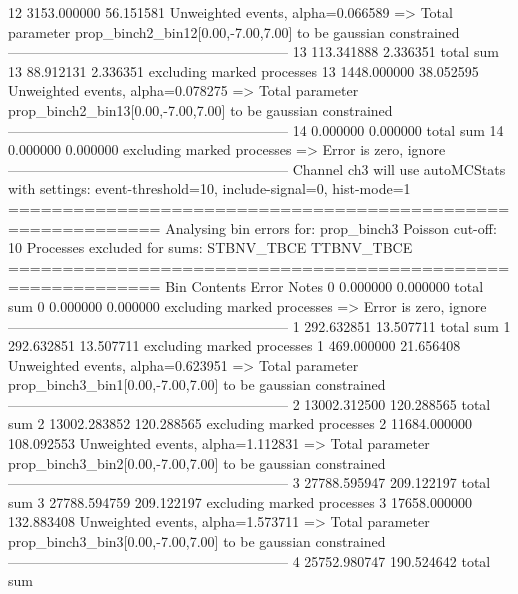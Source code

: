 12         3153.000000     56.151581       Unweighted events, alpha=0.066589
  => Total parameter prop_binch2_bin12[0.00,-7.00,7.00] to be gaussian constrained
------------------------------------------------------------
13         113.341888      2.336351        total sum                     
13         88.912131       2.336351        excluding marked processes    
13         1448.000000     38.052595       Unweighted events, alpha=0.078275
  => Total parameter prop_binch2_bin13[0.00,-7.00,7.00] to be gaussian constrained
------------------------------------------------------------
14         0.000000        0.000000        total sum                     
14         0.000000        0.000000        excluding marked processes    
  => Error is zero, ignore      
------------------------------------------------------------
Channel ch3 will use autoMCStats with settings: event-threshold=10, include-signal=0, hist-mode=1
============================================================
Analysing bin errors for: prop_binch3
Poisson cut-off: 10
Processes excluded for sums: STBNV_TBCE TTBNV_TBCE
============================================================
Bin        Contents        Error           Notes                         
0          0.000000        0.000000        total sum                     
0          0.000000        0.000000        excluding marked processes    
  => Error is zero, ignore      
------------------------------------------------------------
1          292.632851      13.507711       total sum                     
1          292.632851      13.507711       excluding marked processes    
1          469.000000      21.656408       Unweighted events, alpha=0.623951
  => Total parameter prop_binch3_bin1[0.00,-7.00,7.00] to be gaussian constrained
------------------------------------------------------------
2          13002.312500    120.288565      total sum                     
2          13002.283852    120.288565      excluding marked processes    
2          11684.000000    108.092553      Unweighted events, alpha=1.112831
  => Total parameter prop_binch3_bin2[0.00,-7.00,7.00] to be gaussian constrained
------------------------------------------------------------
3          27788.595947    209.122197      total sum                     
3          27788.594759    209.122197      excluding marked processes    
3          17658.000000    132.883408      Unweighted events, alpha=1.573711
  => Total parameter prop_binch3_bin3[0.00,-7.00,7.00] to be gaussian constrained
------------------------------------------------------------
4          25752.980747    190.524642      total sum                     

